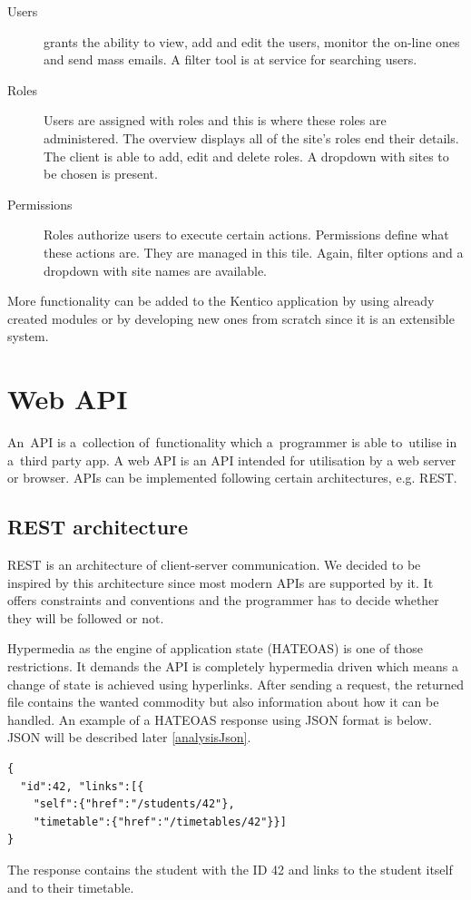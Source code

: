 \begin{description}
\begin {description}
	\item [Users] grants the ability to view, add and edit the users, monitor the on-line ones and send mass emails. A filter tool is at service for searching users.
	\item [Roles] Users are assigned with roles and this is where these roles are administered. The overview displays all of the site's roles end their details. The client is able to add, edit and delete roles. A dropdown with sites to be chosen is present. 
	\item [Permissions] Roles authorize users to execute certain actions. Permissions define what these actions are. They are managed in this tile. Again, filter options and a dropdown with site names are available. 
	\end{description}
\end{description}
More functionality can be added to the Kentico application by using already created modules or by developing new ones from scratch since it is an extensible system.

\section{Web API} \label{analysisWebAPI}
An~API is a~collection of~functionality which a~programmer is able to~utilise in a~third party app. A web API is an API intended for utilisation by a web server or browser. APIs can be implemented following certain architectures, e.g. REST.
\subsection{REST architecture} \label{analysisREST} \cite{rest}
REST is an architecture of client-server communication. We decided to be inspired by this architecture since most modern APIs are supported by it. It offers constraints and conventions and the programmer has to decide whether they will be followed or not. 

\cite{hateoas} Hypermedia as the engine of application state (HATEOAS) is one of those restrictions. It demands the API is completely hypermedia driven which means a change of state is achieved using hyperlinks. After sending a request, the returned file contains the wanted commodity but also information about how it can be handled. An example of a HATEOAS response using JSON format is below. JSON will be described later \ref{analysisJson}.
\lstset{style=sharpc, numbers=none}
\begin{lstlisting}
{
  "id":42, "links":[{ 
	"self":{"href":"/students/42"}, 
	"timetable":{"href":"/timetables/42"}}]
}
\end{lstlisting}
The response contains the student with the ID 42 and links to the student itself and to their timetable. 

